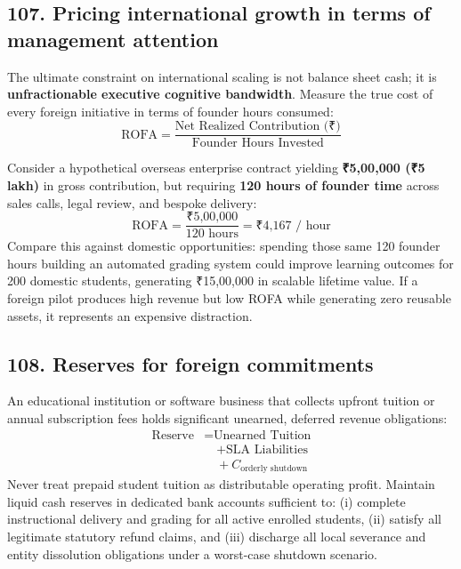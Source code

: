 \subsection{107. Pricing international growth in terms of management attention}

The ultimate constraint on international scaling is not balance sheet cash; it is \textbf{unfractionable executive cognitive bandwidth}. Measure the true cost of every foreign initiative in terms of founder hours consumed:
\begin{equation}
\text{ROFA} = \frac{\text{Net Realized Contribution (₹)}}{\text{Founder Hours Invested}}
\end{equation}

Consider a hypothetical overseas enterprise contract yielding \textbf{₹5,00,000 (₹5 lakh)} in gross contribution, but requiring \textbf{120 hours of founder time} across sales calls, legal review, and bespoke delivery:
\begin{equation}
\text{ROFA} = \frac{\text{₹5,00,000}}{120 \text{ hours}} = \text{₹4,167 / hour}
\end{equation}
Compare this against domestic opportunities: spending those same 120 founder hours building an automated grading system could improve learning outcomes for 200 domestic students, generating ₹15,00,000 in scalable lifetime value. If a foreign pilot produces high revenue but low ROFA while generating zero reusable assets, it represents an expensive distraction.

\subsection{108. Reserves for foreign commitments}

An educational institution or software business that collects upfront tuition or annual subscription fees holds significant unearned, deferred revenue obligations:
\begin{equation}
\begin{aligned}
\text{Reserve} &= \text{Unearned Tuition} \\
&\quad + \text{SLA Liabilities} \\
&\quad + C_{\text{orderly shutdown}}
\end{aligned}
\end{equation}
Never treat prepaid student tuition as distributable operating profit. Maintain liquid cash reserves in dedicated bank accounts sufficient to: (i) complete instructional delivery and grading for all active enrolled students, (ii) satisfy all legitimate statutory refund claims, and (iii) discharge all local severance and entity dissolution obligations under a worst-case shutdown scenario.


